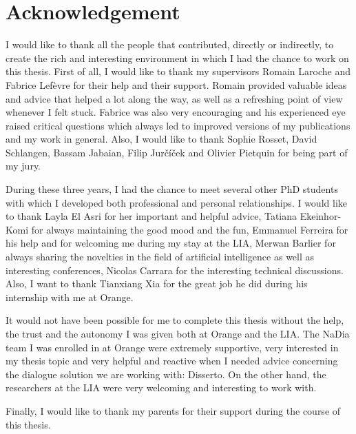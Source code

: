 \chapter*{Acknowledgement}

        I would like to thank all the people that contributed, directly or indirectly, to create the rich and interesting environment in which I had the chance to work on this thesis. First of all, I would like to thank my supervisors Romain Laroche and Fabrice Lef\`evre for their help and their support. Romain provided valuable ideas and advice that helped a lot along the way, as well as a refreshing point of view whenever I felt stuck. Fabrice was also very encouraging and his experienced eye raised critical questions which always led to improved versions of my publications and my work in general. Also, I would like to thank Sophie Rosset, David Schlangen, Bassam Jabaian, Filip Jur\v{c}\'i\v{c}ek and Olivier Pietquin for being part of my jury.

        During these three years, I had the chance to meet several other PhD students with which I developed both professional and personal relationships. I would like to thank Layla El Asri for her important and helpful advice, Tatiana Ekeinhor-Komi for always maintaining the good mood and the fun, Emmanuel Ferreira for his help and for welcoming me during my stay at the LIA, Merwan Barlier for always sharing the novelties in the field of artificial intelligence as well as interesting conferences, Nicolas Carrara for the interesting technical discussions. Also, I want to thank Tianxiang Xia for the great job he did during his internship with me at Orange.

        It would not have been possible for me to complete this thesis without the help, the trust and the autonomy I was given both at Orange and the LIA. The NaDia team I was enrolled in at Orange were extremely supportive, very interested in my thesis topic and very helpful and reactive when I needed advice concerning the dialogue solution we are working with: Disserto. On the other hand, the researchers at the LIA were very welcoming and interesting to work with.

        Finally, I would like to thank my parents for their support during the course of this thesis.

        
